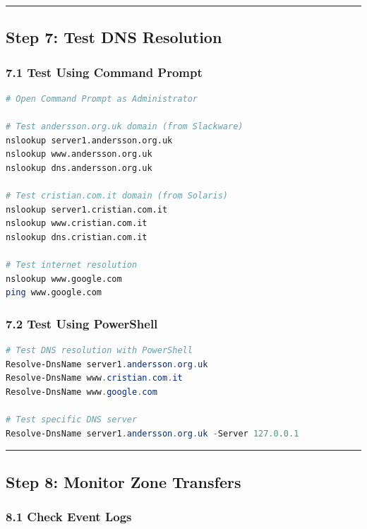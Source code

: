 \begin{center}\rule{0.5\linewidth}{0.5pt}\end{center}

\subsection{Step 7: Test DNS Resolution}\label{step-7-test-dns-resolution}

\subsubsection{7.1 Test Using Command Prompt}\label{test-using-command-prompt}

\begin{lstlisting}[language=bash]
# Open Command Prompt as Administrator

# Test andersson.org.uk domain (from Slackware)
nslookup server1.andersson.org.uk
nslookup www.andersson.org.uk
nslookup dns.andersson.org.uk

# Test cristian.com.it domain (from Solaris)
nslookup server1.cristian.com.it
nslookup www.cristian.com.it
nslookup dns.cristian.com.it

# Test internet resolution
nslookup www.google.com
ping www.google.com
\end{lstlisting}

\subsubsection{7.2 Test Using PowerShell}\label{test-using-powershell}

\begin{lstlisting}[language=powershell]
# Test DNS resolution with PowerShell
Resolve-DnsName server1.andersson.org.uk
Resolve-DnsName www.cristian.com.it
Resolve-DnsName www.google.com

# Test specific DNS server
Resolve-DnsName server1.andersson.org.uk -Server 127.0.0.1
\end{lstlisting}

\begin{center}\rule{0.5\linewidth}{0.5pt}\end{center}

\subsection{Step 8: Monitor Zone Transfers}\label{step-8-monitor-zone-transfers}

\subsubsection{8.1 Check Event Logs}\label{check-event-logs}

